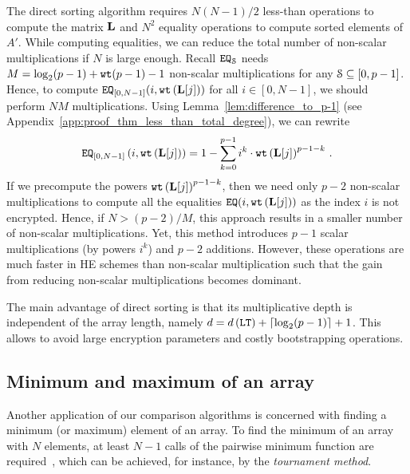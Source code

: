 	The direct sorting algorithm requires $N(N-1)/2$ less-than operations to compute the matrix $\mL$ and $N^2$ equality operations to compute sorted elements of $A'$.
	While computing equalities, we can reduce the total number of non-scalar multiplications if $N$ is large enough.
	Recall $\EQ_\S$ needs $M = \log_2(p-1) + \wt(p-1) - 1$ non-scalar multiplications for any $\S \subseteq [0,p-1]$.
	Hence, to compute $\EQ_{[0,N-1]}(i,\wt\left(\mL[j]\right))$ for all $i \in [0,N-1]$, we should perform $N M$ multiplications.
	Using Lemma~\ref{lem:difference_to_p-1} (see Appendix~\ref{app:proof_thm_less_than_total_degree}), we can rewrite 
	\begin{align*}
		\EQ_{[0,N-1]}\left(i,\wt\left(\mL[j]\right)\right) = 1 - \sum_{k=0}^{p-1} i^k \cdot \wt\left(\mL[j]\right)^{p-1-k}\,.
	\end{align*}
	If we precompute the powers $\wt\left(\mL[j]\right)^{p-1-k}$, then we need only $p-2$ non-scalar multiplications to compute all the equalities $\EQ(i,\wt\left(\mL[j]\right))$ as the index $i$ is not encrypted.
	Hence, if $N > (p-2)/M$, this approach results in a smaller number of non-scalar multiplications.
	Yet, this method introduces $p-1$ scalar multiplications (by powers $i^k$) and $p-2$ additions. 
	However, these operations are much faster in HE schemes than non-scalar multiplication such that the gain from reducing non-scalar multiplications becomes dominant. 
	
	The main advantage of direct sorting is that its multiplicative depth is independent of the array length, namely $d = d\left(\LT\right) + \ceil{\log_2 (p-1)} + 1$.
	This allows to avoid large encryption parameters and costly bootstrapping operations.

\subsection{Minimum and maximum of an array}
\label{sec:min/max}

	Another application of our comparison algorithms is concerned with finding a minimum (or maximum) element of an array.
	To find the minimum of an array with $N$ elements, at least $N-1$ calls of the pairwise minimum function are required~\cite[Chapter 9]{CLR09}, which can be achieved, for instance, by the \emph{tournament method}.
	
